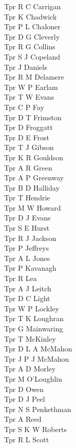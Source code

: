\begin{multicols}{3}
  Tpr R C Carrigan \\
  Tpr K Chadwick \\
  Tpr P L Chaloner \\
  Tpr D G Cleverly \\
  Tpr R G Collins \\
  Tpr S J Copeland \\
  Tpr J Daniels \\
  Tpr R M Delamere \\
  Tpr W P Earlam \\
  Tpr T W Evans \\
  Tpr C P Fay \\
  Tpr D T Frimston \\
  Tpr D Froggatt \\
  Tpr D E Frost \\
  Tpr T J Gibson \\
  Tpr K R Gouldson \\
  Tpr A R Green \\
  Tpr A P Greenway \\
  Tpr B D Halliday \\
  Tpr T Hendrie \\
  Tpr M W Howard \\
  Tpr D J Evans \\
  Tpr S E Hurst \\
  Tpr R J Jackson \\
  Tpr P Jeffreys \\
  Tpr A L Jones \\
  Tpr P Kavanagh \\
  Tpr R Lea \\
  Tpr A J Leitch \\
  Tpr D C Light \\
  Tpr W P Lockley \\
  Tpr T K Loughran \\
  Tpr G Mainwaring \\
  Tpr T McKinley \\
  Tpr D L A McMahon \\
  Tpr J P J McMahon \\
  Tpr A D Morley \\
  Tpr M O'Loughlin \\
  Tpr D Owen \\
  Tpr D J Peel \\
  Tpr N S Penkethman \\
  Tpr A Reed \\
  Tpr S K W Roberts \\
  Tpr R L Scott \\

\end{multicols}
